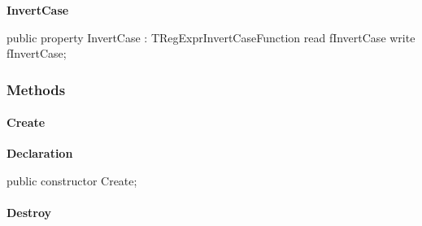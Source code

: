 \documentclass{report}
\newif\ifpdf
\begin{document}
\begin{list}{}
\begin{flushleft}
\ifpdf
\end{flushleft}
\fi


\par  \label{RegExpr.TRegExpr-InvertCase}
\item[\textbf{InvertCase}\hfill]
\ifpdf
\begin{flushleft}
\fi
\begin{ttfamily}
public property InvertCase : TRegExprInvertCaseFunction read fInvertCase write fInvertCase;\end{ttfamily}

\ifpdf
\end{flushleft}
\fi


\par  \end{list}
\subsubsection*{\large{\textbf{Methods}}\normalsize\hspace{1ex}\hfill}
\paragraph*{Create}\hspace*{\fill}

\label{RegExpr.TRegExpr-Create}
\begin{list}{}{
\setlength{\itemindent}{0cm}
\setlength{\listparindent}{0cm}
\setlength{\leftmargin}{\evensidemargin}
\addtolength{\leftmargin}{\tmplength}
\settowidth{\labelsep}{X}
\addtolength{\leftmargin}{\labelsep}
\setlength{\labelwidth}{\tmplength}
}
\item[\textbf{Declaration}\hfill]
\ifpdf
\begin{flushleft}
\fi
\begin{ttfamily}
public constructor Create;\end{ttfamily}

\ifpdf
\end{flushleft}
\fi

\end{list}
\paragraph*{Destroy}\hspace*{\fill}
\end{document}
